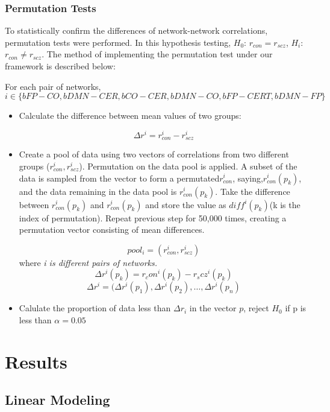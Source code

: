 \documentclass[11pt]{article}
\begin{document}
\subsubsection{Permutation Tests}

To statistically confirm the differences of network-network correlations, permutation tests were performed. In this hypothesis testing, $H_{0}$: $r_{con} = r_{scz}$, $H_{i}$: $r_{con} \neq r_{scz}$.
The method of implementing the permutation test under our framework is described below:

For each pair of networks, $$i \in \{ bFP-CO, bDMN-CER, bCO-CER, bDMN-CO, bFP-CERT, bDMN-FP \}$$ 
\begin{itemize}
\item Calculate the difference between mean values of two groups:

$$ \Delta r^i =  r_{con}^i - r_{scz}^i $$ 

\item  Create a pool of data using two vectors of correlations from two different groups ($r_{con}^i, r_{scz}^i$). Permutation on the data pool is applied. A subset of the data is sampled from the vector to form a permutated$ r_{con}^i$, saying,$ r_{con}^i(p_k)$, and the data remaining in the data pool is $r_{con}^i(p_k)$. Take the difference between $ r_{con}^i(p_k)$ and  $r_{con}^i(p_k)$ and store the value as $diff^i(p_k)$(k is the index of permutation). Repeat previous step for 50,000 times, creating a permutation vector consisting of mean differences.

$$ pool_{i} = (r_{con}^i, r_{scz}^i) $$ where \textit{ i is different pairs of networks.}
$$ \Delta r^i(p_k) = r_con^i(p_k) - r_scz^i(p_k) $$ 
$$ \Delta r^i = (\Delta r^i(p_1), \Delta r^i(p_2), \dots, \Delta r^i(p_n) $$

\item Calulate the proportion of data less than $\Delta r_i$ in the vector $p$, reject $H_0$ if p is less than $\alpha = 0.05$

\end{itemize}


\section{Results}

\subsection{Linear Modeling}
\end{document}
